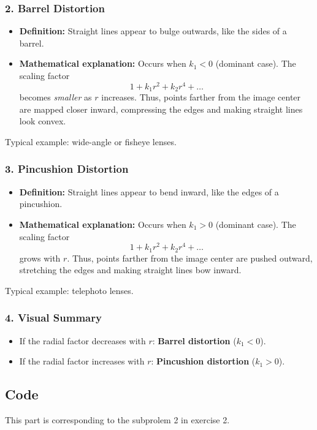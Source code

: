 \documentclass[12pt]{article}
\begin{document}
\subsubsection*{2. Barrel Distortion}

\begin{itemize}
    \item \textbf{Definition:} Straight lines appear to bulge outwards, like the sides of a barrel.
    \item \textbf{Mathematical explanation:} Occurs when $k_1 < 0$ (dominant case). 
    The scaling factor
    \[
    1 + k_1 r^2 + k_2 r^4 + \dots
    \]
    becomes \emph{smaller} as $r$ increases. 
    Thus, points farther from the image center are mapped closer inward, 
    compressing the edges and making straight lines look convex.
\end{itemize}

Typical example: wide-angle or fisheye lenses.

\subsubsection*{3. Pincushion Distortion}

\begin{itemize}
    \item \textbf{Definition:} Straight lines appear to bend inward, like the edges of a pincushion.
    \item \textbf{Mathematical explanation:} Occurs when $k_1 > 0$ (dominant case).
    The scaling factor
    \[
    1 + k_1 r^2 + k_2 r^4 + \dots
    \]
    grows with $r$. 
    Thus, points farther from the image center are pushed outward, stretching the edges
    and making straight lines bow inward.
\end{itemize}

Typical example: telephoto lenses.

\subsubsection*{4. Visual Summary}

\begin{itemize}
    \item If the radial factor decreases with $r$: \textbf{Barrel distortion} ($k_1 < 0$).
    \item If the radial factor increases with $r$: \textbf{Pincushion distortion} ($k_1 > 0$).
\end{itemize}
\subsection{Code}
This part is corresponding to the subprolem 2 in exercise 2. 
\end{document}
